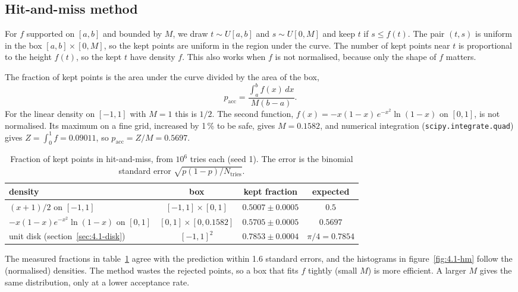 \subsection{Hit-and-miss method}

For $f$ supported on $[a,b]$ and bounded by $M$, we draw $t \sim U[a,b]$ and $s \sim U[0,M]$ and keep
$t$ if $s \le f(t)$. The pair $(t,s)$ is uniform in the box $[a,b]\times[0,M]$, so the kept points are
uniform in the region under the curve. The number of kept points near $t$ is proportional to the
height $f(t)$, so the kept $t$ have density $f$. This also works when $f$ is not normalised, because
only the shape of $f$ matters.

The fraction of kept points is the area under the curve divided by the area of the box,
\begin{equation}
  p_{\text{acc}} = \frac{\int_a^b f(x)\,dx}{M(b-a)} .
\end{equation}
For the linear density on $[-1,1]$ with $M = 1$ this is $1/2$. The second function,
$f(x) = -x(1-x)\,e^{-x^2}\ln(1-x)$ on $[0,1]$, is not normalised. Its maximum on a fine grid,
increased by 1\,\% to be safe, gives $M = 0.1582$, and numerical integration
(\texttt{scipy.integrate.quad}) gives $Z = \int_0^1 f = 0.09011$, so $p_{\text{acc}} = Z/M = 0.5697$.

\begin{table}[htbp]
  \centering
  \caption{Fraction of kept points in hit-and-miss, from $10^6$ tries each (seed 1). The error is
    the binomial standard error $\sqrt{p(1-p)/N_{\text{tries}}}$.}
  \label{tab:4.1-acceptance}
  \begin{tabular}{lccc}
    \toprule
    density & box & kept fraction & expected \\
    \midrule
    $(x+1)/2$ on $[-1,1]$                 & $[-1,1]\times[0,1]$      & $0.5007 \pm 0.0005$ & $0.5$ \\
    $-x(1-x)e^{-x^2}\ln(1-x)$ on $[0,1]$  & $[0,1]\times[0,0.1582]$  & $0.5705 \pm 0.0005$ & $0.5697$ \\
    unit disk (section~\ref{sec:4.1-disk}) & $[-1,1]^2$              & $0.7853 \pm 0.0004$ & $\pi/4 = 0.7854$ \\
    \bottomrule
  \end{tabular}
\end{table}

The measured fractions in table~\ref{tab:4.1-acceptance} agree with the prediction within 1.6
standard errors, and the histograms in figure~\ref{fig:4.1-hm} follow the (normalised) densities.
The method wastes the rejected points, so a box that fits $f$ tightly (small $M$) is more efficient.
A larger $M$ gives the same distribution, only at a lower acceptance rate.

